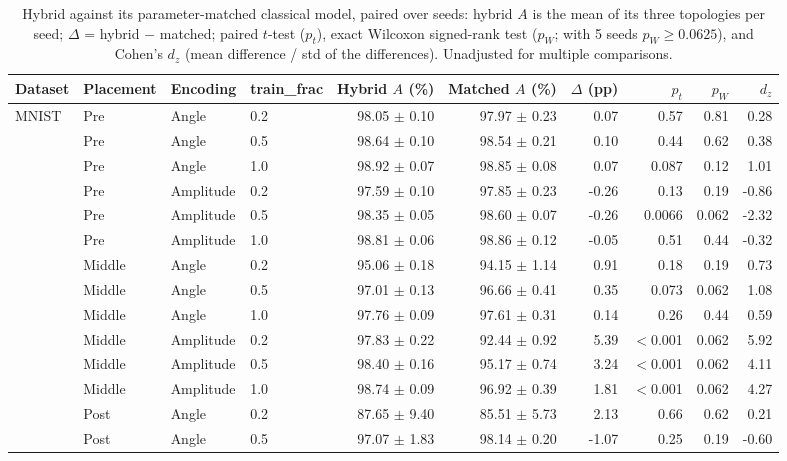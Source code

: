 \begin{table}[!t]
\centering
\caption{Hybrid against its parameter-matched classical model, paired over seeds: hybrid $A$ is the mean of its three topologies per seed; $\Delta$ = hybrid $-$ matched; paired $t$-test ($p_t$), exact Wilcoxon signed-rank test ($p_W$; with 5 seeds $p_W \geq 0.0625$), and Cohen's $d_z$ (mean difference / std of the differences). Unadjusted for multiple comparisons.}
\label{tab:matched_stats}
\scriptsize
\begin{tabular}{llllrrrrrr}
\toprule
Dataset & Placement & Encoding & train\_frac & Hybrid $A$ (\%) & Matched $A$ (\%) & $\Delta$ (pp) & $p_t$ & $p_W$ & $d_z$ \\
\midrule
MNIST & Pre & Angle & 0.2 & 98.05 $\pm$ 0.10 & 97.97 $\pm$ 0.23 & 0.07 & 0.57 & 0.81 & 0.28 \\
 & Pre & Angle & 0.5 & 98.64 $\pm$ 0.10 & 98.54 $\pm$ 0.21 & 0.10 & 0.44 & 0.62 & 0.38 \\
 & Pre & Angle & 1.0 & 98.92 $\pm$ 0.07 & 98.85 $\pm$ 0.08 & 0.07 & 0.087 & 0.12 & 1.01 \\
 & Pre & Amplitude & 0.2 & 97.59 $\pm$ 0.10 & 97.85 $\pm$ 0.23 & -0.26 & 0.13 & 0.19 & -0.86 \\
 & Pre & Amplitude & 0.5 & 98.35 $\pm$ 0.05 & 98.60 $\pm$ 0.07 & -0.26 & 0.0066 & 0.062 & -2.32 \\
 & Pre & Amplitude & 1.0 & 98.81 $\pm$ 0.06 & 98.86 $\pm$ 0.12 & -0.05 & 0.51 & 0.44 & -0.32 \\
 & Middle & Angle & 0.2 & 95.06 $\pm$ 0.18 & 94.15 $\pm$ 1.14 & 0.91 & 0.18 & 0.19 & 0.73 \\
 & Middle & Angle & 0.5 & 97.01 $\pm$ 0.13 & 96.66 $\pm$ 0.41 & 0.35 & 0.073 & 0.062 & 1.08 \\
 & Middle & Angle & 1.0 & 97.76 $\pm$ 0.09 & 97.61 $\pm$ 0.31 & 0.14 & 0.26 & 0.44 & 0.59 \\
 & Middle & Amplitude & 0.2 & 97.83 $\pm$ 0.22 & 92.44 $\pm$ 0.92 & 5.39 & $<$0.001 & 0.062 & 5.92 \\
 & Middle & Amplitude & 0.5 & 98.40 $\pm$ 0.16 & 95.17 $\pm$ 0.74 & 3.24 & $<$0.001 & 0.062 & 4.11 \\
 & Middle & Amplitude & 1.0 & 98.74 $\pm$ 0.09 & 96.92 $\pm$ 0.39 & 1.81 & $<$0.001 & 0.062 & 4.27 \\
 & Post & Angle & 0.2 & 87.65 $\pm$ 9.40 & 85.51 $\pm$ 5.73 & 2.13 & 0.66 & 0.62 & 0.21 \\
 & Post & Angle & 0.5 & 97.07 $\pm$ 1.83 & 98.14 $\pm$ 0.20 & -1.07 & 0.25 & 0.19 & -0.60 \\

\end{tabular}
\end{table}
